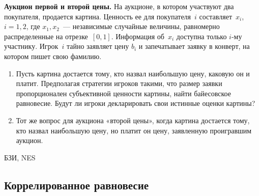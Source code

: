 \begin{problem}
 {\bf Аукцион первой и второй цены.} На аукционе, в
котором участвуют два покупателя, продается картина.
Ценность ее для покупателя~$i$ составляет~$x_i$, $i=1,2$,
где $x_1,x_2$~--- независимые случайные величины,
равномерно распределенные на отрезке~$[0,1]$. Информация
об~$x_i$ доступна только $i$-му участнику. Игрок~$i$ тайно
заявляет цену $b_i$ и запечатывает заявку в конверт, на
котором пишет свою фамилию.

\begin{enumerate}

\item Пусть картина достается тому, кто назвал наибольшую
цену, каковую он и платит. Предполагая стратегии игроков
такими, что размер заявки пропорционален субъективной
ценности картины, найти байесовское равновесие. Будут ли
игроки декларировать свои истинные оценки картины?

\item Тот же вопрос для аукциона «второй цены», когда
картина достается тому, кто назвал наибольшую цену, но
платит он цену, заявленную проигравшим аукцион.

\end{enumerate}





\begin{source}
БЗИ, NES
\end{source}


\begin{sol}

\end{sol}
\end{problem}



\subsection{Коррелированное равновесие}


